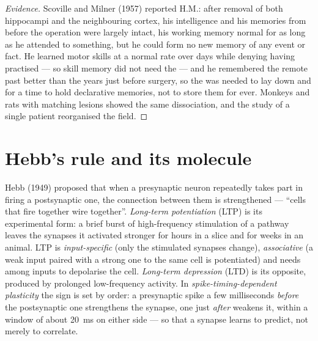 \begin{proof}[Evidence]
Scoville and Milner (1957) reported H.M.: after removal of both
hippocampi and the neighbouring cortex, his intelligence and his
memories from before the operation were largely intact, his working
memory normal for as long as he attended to something, but he could
form no new memory of any event or fact. He learned motor skills at a
normal rate over days while denying having practised --- so skill
memory did not need the  --- and he remembered the remote
past better than the years just before surgery, so the  was
needed to lay down and for a time to hold declarative memories, not to
store them for ever. Monkeys and rats with matching lesions showed the
same dissociation, and the study of a single patient reorganised the
field.
\end{proof}

\section{Hebb's rule and its molecule}

\begin{definition}\label{def:b3:learning-memory:ltp}
Hebb (1949) proposed that when a presynaptic neuron repeatedly takes
part in firing a postsynaptic one, the connection between them is
strengthened --- ``cells that fire together wire together''.
\emph{Long-term potentiation} (LTP) is its experimental form: a brief
burst of high-frequency stimulation of a pathway leaves the synapses
it activated stronger for hours in a slice and for weeks in an
animal. LTP is \emph{input-specific} (only the stimulated synapses
change), \emph{associative} (a weak input paired with a strong one to
the same cell is potentiated) and needs \emph{} among
inputs to depolarise the cell. \emph{Long-term depression} (LTD) is its
opposite, produced by prolonged low-frequency activity. In
\emph{spike-timing-dependent plasticity} the sign is set by order: a
presynaptic spike a few milliseconds \emph{before} the postsynaptic
one strengthens the synapse, one just \emph{after} weakens it, within
a window of about \qty{20}{ms} on either side --- so that a synapse
learns to predict, not merely to correlate.
\end{definition}


